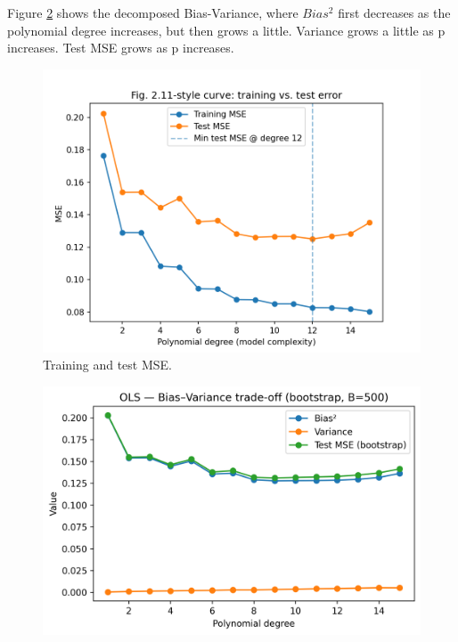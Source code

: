 \documentclass[amssymb,twocolumn,aps]{revtex4-2}
\begin{document}
Figure \ref{fig:g_ols} shows the decomposed Bias-Variance, where $Bias^2$ first decreases as the polynomial degree increases, but then grows a little. Variance grows a little as p increases. Test MSE grows as p increases. 

\begin{figure}[H]
    \centering
    \includegraphics[width=1\linewidth]{Project-1/Figures/fig2.11_style.png}
    \caption{Training and test MSE. }
    \label{fig:fig2.11}
\end{figure}

\begin{figure}[H]
    \centering
    \includegraphics[width=1\linewidth]{Project-1/Figures/g_ols_bias_variance_bootstrap.png}
    \caption{}
    \label{fig:g_ols}
\end{figure}
\end{document}
